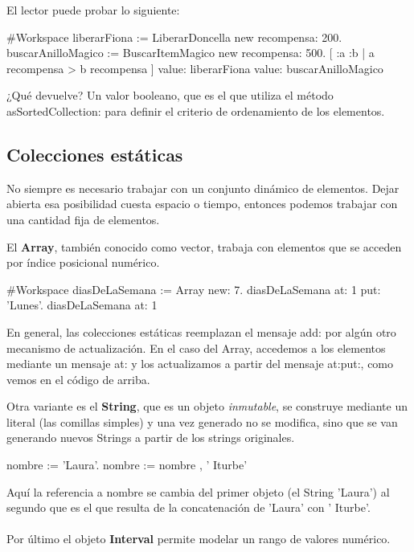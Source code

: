 \documentclass[a4paper,12pt]{book}
\begin{document}
El lector puede probar lo siguiente:

\begin{code}
#Workspace
liberarFiona := LiberarDoncella new recompensa: 200.
buscarAnilloMagico := BuscarItemMagico new recompensa: 500.
[ :a :b | a recompensa > b recompensa ] 
     value: liberarFiona value: buscarAnilloMagico
\end{code}

¿Qué devuelve? Un valor booleano, que es el que utiliza el método asSortedCollection: para definir el criterio
de ordenamiento de los elementos. 

\subsection{Colecciones estáticas}

No siempre es necesario trabajar con un conjunto dinámico de elementos. Dejar abierta esa posibilidad cuesta
espacio o tiempo, entonces podemos trabajar con una cantidad fija de elementos.

El \textbf{Array}, también conocido como vector, trabaja con elementos que se acceden por índice posicional
numérico.

\begin{code}
#Workspace
diasDeLaSemana := Array new: 7.
diasDeLaSemana at: 1 put: 'Lunes'.
diasDeLaSemana at: 1
\end{code}

En general, las colecciones estáticas reemplazan el mensaje add: por algún otro mecanismo de actualización.
En el caso del Array, accedemos a los elementos mediante un mensaje at: y los actualizamos a partir del mensaje
at:put:, como vemos en el código de arriba.

Otra variante es el \textbf{String}, que es un objeto \textit{inmutable}, se construye mediante un literal 
(las comillas simples) y una vez generado no se modifica, sino que se van generando nuevos Strings a partir
de los strings originales.

\begin{code}
nombre := 'Laura'.
nombre := nombre , ' Iturbe'
\end{code}

Aquí la referencia a nombre se cambia del primer objeto (el String 'Laura') al segundo que es el que resulta
de la concatenación de 'Laura' con ' Iturbe'.
\\
\\
Por último el objeto \textbf{Interval} permite modelar un rango de valores numérico.
\end{document}
